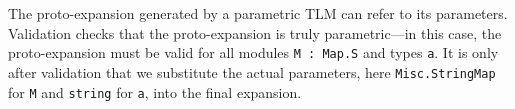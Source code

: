 \documentclass[acmsmall]{acmart}
\newcommand{\li}[1]{\lstinline[basicstyle=\ttfamily\fontsize{9pt}{1em}\selectfont]{#1}}
\begin{document}

The proto-expansion generated by a parametric TLM can refer to its parameters. Validation checks that the proto-expansion is truly parametric---in this case, the proto-expansion must be valid for all modules \li{M : Map.S} and types \li{a}. It is only after validation that we substitute the actual parameters, here \li{Misc.StringMap} for \li{M} and \li{string} for \li{a}, into the final expansion. 


\end{document}
